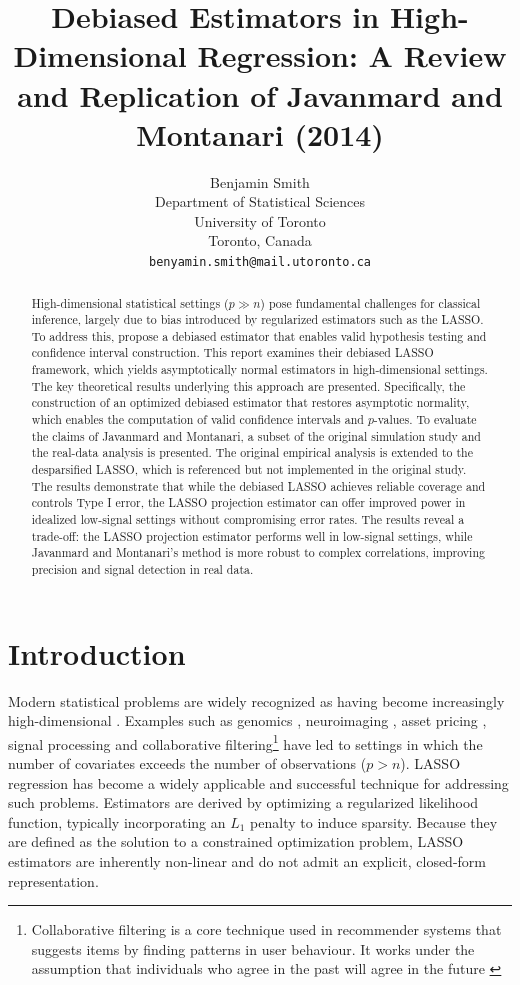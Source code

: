 \documentclass{article}
\title{Debiased Estimators in High-Dimensional Regression: A Review and Replication of Javanmard and Montanari (2014)}
\author{
 Benjamin Smith\orcidlink{0009-0007-2206-0177} \\
  Department of Statistical Sciences\\
  University of Toronto\\
  Toronto, Canada \\
  \texttt{benyamin.smith@mail.utoronto.ca} \\
}
\begin{document}
\maketitle
\begin{abstract}
High-dimensional statistical settings ($p \gg n$) pose fundamental challenges for classical inference, largely due to bias introduced by regularized estimators such as the LASSO. To address this, \citet{javanmard14a} propose a debiased estimator that enables valid hypothesis testing and confidence interval construction. This report examines their debiased LASSO framework, which yields asymptotically normal estimators in high-dimensional settings. The key theoretical results underlying this approach are presented. Specifically, the construction of an optimized debiased estimator that restores asymptotic normality, which enables the computation of valid confidence intervals and $p$-values. To evaluate the claims of Javanmard and Montanari, a subset of the original simulation study and the real-data analysis is presented. The original empirical analysis is extended to the desparsified LASSO, which is referenced but not implemented in the original study. The results demonstrate that while the debiased LASSO achieves reliable coverage and controls Type I error, the LASSO projection estimator can offer improved power in idealized low-signal settings without compromising error rates. The results reveal a trade-off: the LASSO projection estimator performs well in low-signal settings, while Javanmard and Montanari’s method is more robust to complex correlations, improving precision and signal detection in real data.
\end{abstract}



\newpage
\section{Introduction}

Modern statistical problems are widely recognized as having become increasingly high-dimensional \citep{javanmard14a}. Examples such as genomics \citep{Peng_Zhu_Bergamaschi_Han_Noh_Pollack_Wang_2010}, neuroimaging \citep{Yamashita2008}, asset pricing \citep{Kozak_Nagel_Santosh_2019}, signal processing \citep{lustig2007sparse} and collaborative filtering\footnote{Collaborative filtering is a core technique used in recommender systems that suggests items by finding patterns in user behaviour. It works under the assumption that individuals who agree in the past will agree in the future \citep{Al_Ghuribi_Noah_2021}}\citep{koren2009} have led to settings in which the number of covariates exceeds the number of observations ($p > n$). LASSO regression \citep{Tibshirani_1996} has become a widely applicable and successful technique for addressing such problems. Estimators are derived by optimizing a regularized likelihood function, typically incorporating an $L_1$ penalty to induce sparsity. Because they are defined as the solution to a constrained optimization problem, LASSO estimators are inherently non-linear and do not admit an explicit, closed-form representation.
\end{document}
